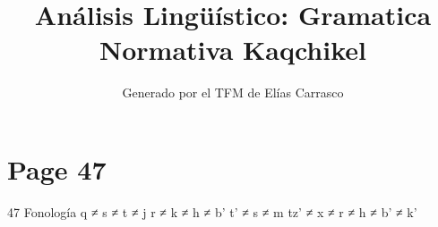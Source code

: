 \documentclass{article}%
\title{Análisis Lingüístico: Gramatica Normativa Kaqchikel}%
\author{Generado por el TFM de Elías Carrasco}%
\begin{document}
%
\normalsize%
\maketitle%
\section{Page 47}%
\label{sec:Page47}%
47 Fonología %
q ≠ s ≠ t ≠ j %
r ≠ k ≠ h ≠ b’ %
t’ ≠ s ≠ m %
tz’ ≠ x ≠ r ≠ h ≠ b’ ≠ k’ 

%
\end{document}
